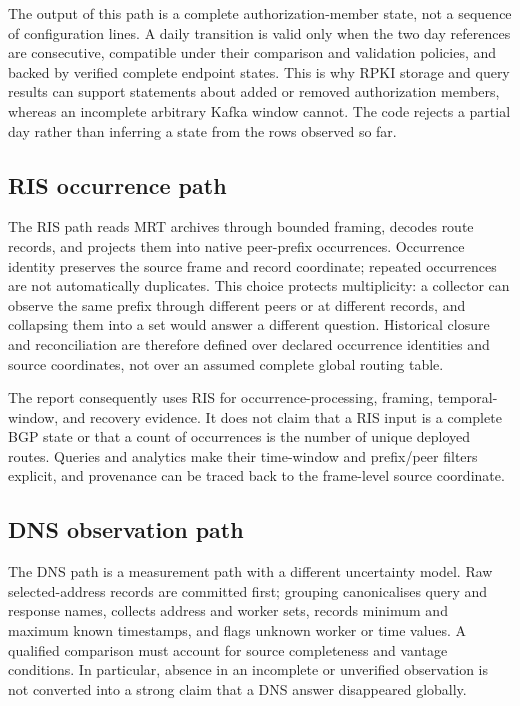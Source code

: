 The output of this path is a complete authorization-member state, not a sequence of configuration lines. A daily transition is valid only when the two day references are consecutive, compatible under their comparison and validation policies, and backed by verified complete endpoint states. This is why RPKI storage and query results can support statements about added or removed authorization members, whereas an incomplete arbitrary Kafka window cannot. The code rejects a partial day rather than inferring a state from the rows observed so far.

\subsection{RIS occurrence path}

The RIS path reads MRT archives through bounded framing, decodes route records, and projects them into native peer-prefix occurrences. Occurrence identity preserves the source frame and record coordinate; repeated occurrences are not automatically duplicates. This choice protects multiplicity: a collector can observe the same prefix through different peers or at different records, and collapsing them into a set would answer a different question. Historical closure and reconciliation are therefore defined over declared occurrence identities and source coordinates, not over an assumed complete global routing table.

The report consequently uses RIS for occurrence-processing, framing, temporal-window, and recovery evidence. It does not claim that a RIS input is a complete BGP state or that a count of occurrences is the number of unique deployed routes. Queries and analytics make their time-window and prefix/peer filters explicit, and provenance can be traced back to the frame-level source coordinate.

\subsection{DNS observation path}

The DNS path is a measurement path with a different uncertainty model. Raw selected-address records are committed first; grouping canonicalises query and response names, collects address and worker sets, records minimum and maximum known timestamps, and flags unknown worker or time values. A qualified comparison must account for source completeness and vantage conditions. In particular, absence in an incomplete or unverified observation is not converted into a strong claim that a DNS answer disappeared globally.

